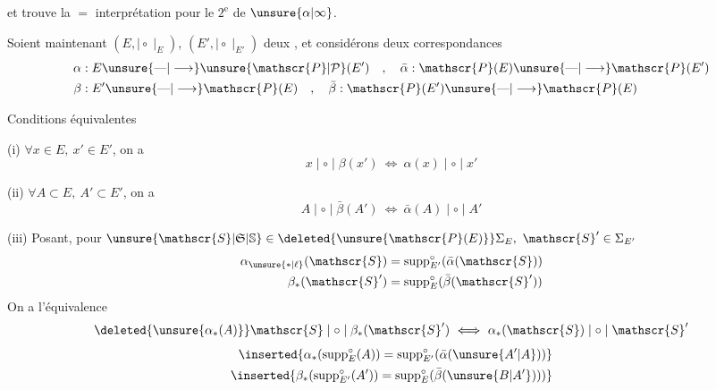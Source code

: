 
et  trouve la $=$ interprétation pour le $2^{\mathrm e}$  de $\unsure{\alpha|\infty}$.

Soient maintenant $(E,\mid\circ\mid_E)$, $(E',\mid\circ\mid_{E'})$ deux , et considérons deux correspondances
\[
\begin{aligned}
\alpha &: E \unsure{\text{---}|\longrightarrow} \unsure{\mathscr{P}|\mathcal{P}}(E') \quad,\quad \bar\alpha : \mathscr{P}(E)\unsure{\text{---}|\longrightarrow}\mathscr{P}(E')\\
\beta &: E'\unsure{\text{---}|\longrightarrow}\mathscr{P}(E) \quad,\quad \bar\beta : \mathscr{P}(E')\unsure{\text{---}|\longrightarrow}\mathscr{P}(E)
\end{aligned}
\]

 Conditions équivalentes

(i) $\forall x\in E,\ x'\in E'$, on a
\[
x\mid\circ\mid\beta(x')\ \Longleftrightarrow\ \alpha(x)\mid\circ\mid x'
\]

(ii) $\forall A\subset E,\ A'\subset E'$, on a
\[
A\mid\circ\mid\bar\beta(A')\ \Longleftrightarrow\ \bar\alpha(A)\mid\circ\mid A'
\]

(iii) Posant, pour $\unsure{\mathscr{S}|\mathfrak{S}|\mathbb{S}}\in\deleted{\unsure{\mathscr{P}(E)}}\Sigma_E,\ \mathscr{S}'\in\Sigma_{E'}$
\[
\begin{aligned}
\alpha_{\unsure{*|\ell}}(\mathscr{S})&=\operatorname{supp}^{\circ}_{E'}(\bar\alpha(\mathscr{S}))\\
\beta_*(\mathscr{S}')&=\operatorname{supp}^{\circ}_E(\bar\beta(\mathscr{S}'))
\end{aligned}
\]
 On a  l'équivalence
\[
\deleted{\unsure{\alpha_*(A)}}\mathscr{S}\mid\circ\mid\beta_*(\mathscr{S}')\ \Longleftrightarrow\ \alpha_*(\mathscr{S})\mid\circ\mid\mathscr{S}'
\]
\[
\begin{aligned}
\inserted{\alpha_*(\operatorname{supp}^{\circ}_E(A))=\operatorname{supp}^{\circ}_{E'}(\bar\alpha(\unsure{A'|A}))}\\
\inserted{\beta_*(\operatorname{supp}^{\circ}_{E'}(A'))=\operatorname{supp}^{\circ}_E(\bar\beta(\unsure{B|A'})))}
\end{aligned}
\]
\quad{}

